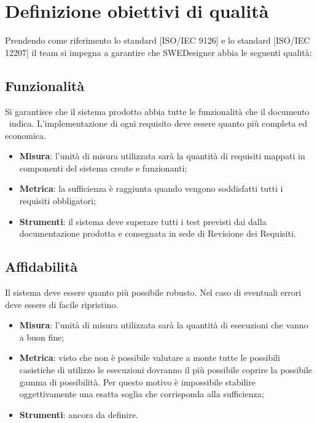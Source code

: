 \documentclass[../PianoDiQualifica.tex]{subfiles}
\begin{document}
\section{Definizione obiettivi di qualità}
	Prendendo come riferimento lo standard [ISO/IEC 9126] e lo standard [ISO/IEC 12207] il team si impegna a garantire che SWEDesigner abbia le seguenti qualità:
	\subsection{Funzionalità}
		Si garantisce che il sistema prodotto abbia tutte le funzionalità che il documento \analisideirequisitiv\ indica. L'implementazione di ogni requisito deve essere quanto più completa ed economica.
		\begin{itemize}
			\item \textbf{Misura}: l'unità di misura utilizzata sarà la quantità di requisiti mappati in componenti del sistema create e funzionanti; %
			\item \textbf{Metrica}: la sufficienza è raggiunta quando vengono soddisfatti tutti i requisiti obbligatori;
			\item \textbf{Strumenti}: il sistema deve superare tutti i test previsti dai dalla documentazione prodotta e consegnata in sede di Revisione dei Requisiti.
		\end{itemize}
	\subsection{Affidabilità}
		Il sistema deve essere quanto più possibile robusto. Nel caso di eventuali errori deve essere di facile ripristino.
		\begin{itemize}
			\item \textbf{Misura}: l'unità di misura utilizzata sarà la quantità di esecuzioni che vanno a buon fine;
			\item \textbf{Metrica}: visto che non è possibile valutare a monte tutte le possibili casistiche di utilizzo le esecuzioni dovranno il più possibile coprire la possibile gamma di possibilità. Per questo motivo è impossibile stabilire oggettivamente una esatta soglia che corrisponda alla sufficienza;
			\item \textbf{Strumenti}: ancora da definire.
		\end{itemize}
\end{document}
